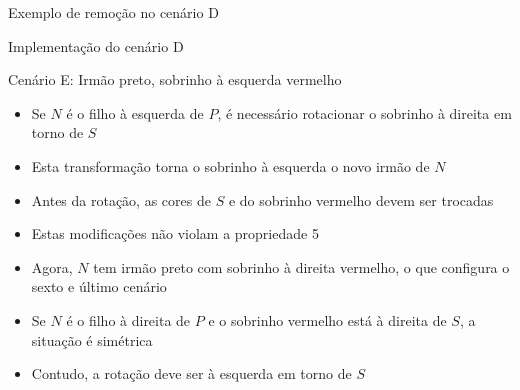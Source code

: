 \begin{frame}[fragile]{Exemplo de remoção no cenário D}


\end{frame}

\begin{frame}[fragile]{Implementação do cenário D}
\end{frame}

\begin{frame}[fragile]{Cenário E: Irmão preto, sobrinho à esquerda vermelho}

    \begin{itemize}
        \item Se $N$ é o filho à esquerda de $P$, é necessário rotacionar o sobrinho
            à direita em torno de $S$

        \item Esta transformação torna o sobrinho à esquerda o novo irmão de $N$

        \item Antes da rotação, as cores de $S$ e do sobrinho vermelho devem ser trocadas

        \item Estas modificações não violam a propriedade 5

        \item Agora, $N$ tem irmão preto com sobrinho à direita vermelho, o que configura o 
            sexto e último cenário

        \item Se $N$ é o filho à direita de $P$ e o sobrinho vermelho está à direita de $S$,
            a situação é simétrica

        \item Contudo, a rotação deve ser à esquerda em torno de $S$
    \end{itemize}

\end{frame}

